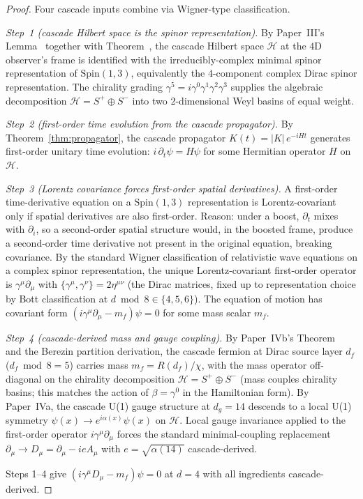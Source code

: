 \documentclass[12pt,a4paper]{article}
\begin{document}
\begin{proof}
Four cascade inputs combine via Wigner-type classification.

\emph{Step~1 (cascade Hilbert space is the spinor representation).}
By Paper~III's Lemma~ together with
Theorem~, the cascade Hilbert space $\mathcal{H}$ at
the $4$D observer's frame is identified with the irreducibly-complex
minimal spinor representation of $\mathrm{Spin}(1,3)$, equivalently
the $4$-component complex Dirac spinor representation. The chirality
grading $\gamma^5 = i\gamma^0\gamma^1\gamma^2\gamma^3$ supplies the
algebraic decomposition $\mathcal{H} = S^+ \oplus S^-$ into two
$2$-dimensional Weyl basins of equal weight.

\emph{Step~2 (first-order time evolution from the cascade
propagator).} By Theorem~\ref{thm:propagator}, the cascade propagator
$K(t) = |K|\,e^{-iHt}$ generates first-order unitary time
evolution: $i\,\partial_t\psi = H\psi$ for some Hermitian operator
$H$ on $\mathcal{H}$.

\emph{Step~3 (Lorentz covariance forces first-order spatial
derivatives).} A first-order time-derivative equation on a
$\mathrm{Spin}(1,3)$ representation is Lorentz-covariant only if
spatial derivatives are also first-order. Reason: under a boost,
$\partial_t$ mixes with $\partial_i$, so a second-order spatial
structure would, in the boosted frame, produce a second-order time
derivative not present in the original equation, breaking covariance.
By the standard Wigner classification of relativistic wave equations
on a complex spinor representation, the unique Lorentz-covariant
first-order operator is $\gamma^\mu\partial_\mu$ with
$\{\gamma^\mu,\gamma^\nu\} = 2\eta^{\mu\nu}$ (the Dirac matrices,
fixed up to representation choice by Bott classification at
$d \bmod 8 \in \{4,5,6\}$). The equation of motion has covariant
form $(i\gamma^\mu\partial_\mu - m_f)\psi = 0$ for some mass scalar
$m_f$.

\emph{Step~4 (cascade-derived mass and gauge coupling).} By
Paper~IVb's Theorem~ and the Berezin partition
derivation, the cascade fermion at Dirac source layer $d_f$
($d_f \bmod 8 = 5$) carries mass $m_f = R(d_f)/\chi$, with the mass
operator off-diagonal on the chirality decomposition
$\mathcal{H} = S^+\oplus S^-$ (mass couples chirality basins; this
matches the action of $\beta = \gamma^0$ in the Hamiltonian form).
By Paper~IVa, the cascade U(1) gauge structure at $d_g = 14$
descends to a local U(1) symmetry
$\psi(x)\to e^{i\alpha(x)}\psi(x)$ on $\mathcal{H}$. Local gauge
invariance applied to the first-order operator
$i\gamma^\mu\partial_\mu$ forces the standard minimal-coupling
replacement $\partial_\mu \to D_\mu = \partial_\mu - ieA_\mu$ with
$e = \sqrt{\alpha(14)}$ cascade-derived.

Steps 1--4 give $(i\gamma^\mu D_\mu - m_f)\psi = 0$ at $d=4$ with
all ingredients cascade-derived.
\end{proof}
\end{document}
